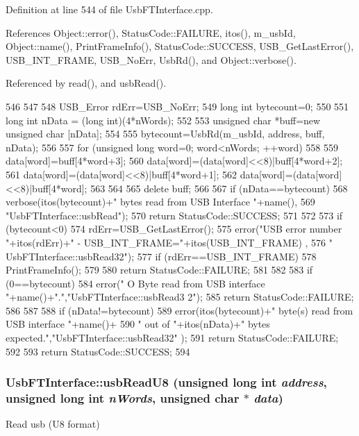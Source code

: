 Definition at line 544 of file UsbFTInterface.cpp.

References Object::error(), StatusCode::FAILURE, itos(), m\_\-usbId, Object::name(), PrintFrameInfo(), StatusCode::SUCCESS, USB\_\-GetLastError(), USB\_\-INT\_\-FRAME, USB\_\-NoErr, UsbRd(), and Object::verbose().

Referenced by read(), and usbRead().


\begin{DoxyCode}
546                                                               {
547   
548   USB_Error rdErr=USB_NoErr;
549   long int bytecount=0;
550 
551   long int nData = (long int)(4*nWords);
552   
553   unsigned char *buff=new unsigned char [nData];
554 
555   bytecount=UsbRd(m_usbId, address, buff, nData);
556 
557   for (unsigned long word=0; word<nWords; ++word)
558   {
559     data[word]=buff[4*word+3];
560     data[word]=(data[word]<<8)|buff[4*word+2];
561     data[word]=(data[word]<<8)|buff[4*word+1];
562     data[word]=(data[word]<<8)|buff[4*word];
563   }
564 
565   delete buff;
566 
567   if (nData==bytecount){
568     verbose(itos(bytecount)+" bytes read from USB Interface "+name(),
569             "UsbFTInterface::usbRead");
570     return StatusCode::SUCCESS;
571   }
572 
573   if (bytecount<0){
574     rdErr=USB_GetLastError();
575     error("USB error number "+itos(rdErr)+" - USB_INT_FRAME="+itos(USB_INT_FRAME)
      ,
576             " UsbFTInterface::usbRead32");
577     if (rdErr==USB_INT_FRAME){
578       PrintFrameInfo();
579     } 
580     return StatusCode::FAILURE;
581   }
582   
583   if (0==bytecount){
584     error(" O Byte read from USB interface "+name()+".","UsbFTInterface::usbRead3
      2");
585     return StatusCode::FAILURE;
586   }
587 
588   if (nData!=bytecount){
589     error(itos(bytecount)+" byte(s) read from USB interface "+name()+
590             " out of "+itos(nData)+" bytes expected.","UsbFTInterface::usbRead32"
      );
591     return StatusCode::FAILURE;    
592   }
593   return StatusCode::SUCCESS;
594 }
\end{DoxyCode}
\hypertarget{classUsbFTInterface_ab0803dd4c3ce3bf26dff4f4145b34546}{
\subsubsection[{usbReadU8}]{ UsbFTInterface::usbReadU8 (unsigned long int {\em address}, \/  unsigned long int {\em nWords}, \/  unsigned char $\ast$ {\em data})}}
\label{classUsbFTInterface_ab0803dd4c3ce3bf26dff4f4145b34546}
Read usb (U8 format) 

